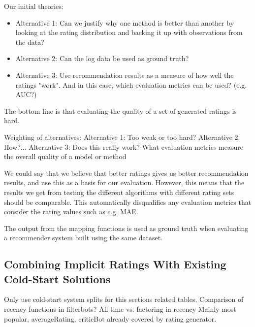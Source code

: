 Our initial theories:

\begin{itemize}
\item Alternative 1: Can we justify why one method is better than another by looking at the rating distribution and backing it up with observations from the data?
\item Alternative 2: Can the log data be used as ground truth?
\item Alternative 3: Use recommendation results as a measure of how well the ratings "work". And in this case, which evaluation metrics can be used? (e.g. AUC?)
\end{itemize}

The bottom line is that evaluating the quality of a set of generated ratings is hard. 

Weighting of alternatives:
Alternative 1: Too weak or too hard?
Alternative 2: How?...
Alternative 3: Does this really work? What evaluation metrics measure the overall quality of a model or method

We could say that we believe that better ratings gives us better recommendation results, and use this as a basis for our evaluation. However, this means that the results we get from testing the different algorithms with different rating sets should be comparable. This automatically disqualifies any evaluation metrics that consider the rating values such as e.g. MAE.

The output from the mapping functions is used as ground truth when evaluating a recommender system built using the same dataset.

\subsection{Combining Implicit Ratings With Existing Cold-Start Solutions}

Only use cold-start system splits for this sections related tables.
Comparison of recency functions in filterbots?
All time vs. factoring in recency
Mainly most popular, averageRating, criticBot already covered by rating generator.
